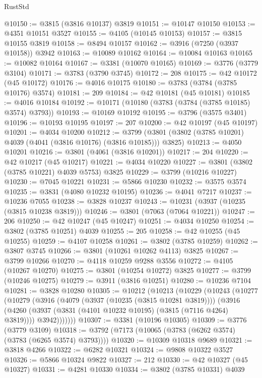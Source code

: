 \begin{lexlean}{RustStd}
\begin{coremodule}
@10150 := @3815 (@3816 @10137) @3819
@10151 := @10147 @10150
@10153 := @4351 @10151 @3527
@10155 := @4105 (@10145 @10153)
@10157 := @3815 @10155 @3819
@10158 := @8494 @10157
@10162 := @3916 (@7250 (@3937 @10158)) @3942
@10163 := @10089 @10162
@10164 := @10084 @10163
@10165 := @10082 @10164
@10167 := @3381 (@10070 @10165)
@10169 := @3776 (@3779 @3104)
@10171 := @3783 (@3790 @3745)
@10172 := 208
@10175 := @42 @10172 (@45 @10172)
@10176 := @4016 @10175
@10180 := @3783 (@3784 (@3785 @10176) @3574)
@10181 := 209
@10184 := @42 @10181 (@45 @10181)
@10185 := @4016 @10184
@10192 := @10171 (@10180 (@3783 (@3784 (@3785 @10185) @3574) @3793))
@10193 := @10169 @10192
@10195 := @3796 (@3575 @3401)
@10196 := @10193 @10195
@10197 := 207
@10200 := @42 @10197 (@45 @10197)
@10201 := @4034 @10200
@10212 := @3799 (@3801 (@3802 (@3785 @10201) @4039 (@4041 (@3816 @10176) (@3816 @10185))) @3825)
@10213 := @4050 @10201
@10216 := @3801 (@4061 (@3816 @10201))
@10217 := 204
@10220 := @42 @10217 (@45 @10217)
@10221 := @4034 @10220
@10227 := @3801 (@3802 (@3785 @10221) @4039 @5753) @3825
@10229 := @3799 (@10216 @10227)
@10230 := @7045 @10221
@10231 := @5866 @10230
@10232 := @3575 @3574
@10235 := @3831 (@4080 @10232 @10195)
@10236 := @4041 @7217
@10237 := @10236 @7055
@10238 := @3828 @10237
@10243 := @10231 (@3937 (@10235 (@3815 @10238 @3819)))
@10246 := @3801 (@7063 (@7064 @10221))
@10247 := 206
@10250 := @42 @10247 (@45 @10247)
@10251 := @4034 @10250
@10254 := @3802 (@3785 @10251) @4039
@10255 := 205
@10258 := @42 @10255 (@45 @10255)
@10259 := @4107 @10258
@10261 := @3802 (@3785 @10259)
@10262 := @3807 @3745
@10266 := @3801 (@10261 @10262 @4113) @3825
@10267 := @3799 @10266
@10270 := @4118 @10259 @9288 @3556
@10272 := @4105 (@10267 @10270)
@10275 := @3801 (@10254 @10272) @3825
@10277 := @3799 (@10246 @10275)
@10279 := @3911 (@3816 @10251)
@10280 := @10236 @7104
@10281 := @3828 @10280
@10305 := @10212
    (@10213
      (@10229
        (@10243
          (@10277
            (@10279
              (@3916
                (@4079 (@3937 (@10235 (@3815 @10281 @3819))))
                (@3916
                  (@4260 (@3937 (@3831 (@4101 @10232 @10195) (@3815 (@7116 @4264) @3819))))
                  @3942)))))))
@10307 := @3381 (@10196 @10305)
@10309 := @3776 (@3779 @3109)
@10318 := @3792 (@7173 (@10065 (@3783 (@6262 @3574) (@3783 (@6265 @3574) @3793))))
@10320 := @10309 @10318 @9689
@10321 := @3818 @4266
@10322 := @6282 @10321
@10324 := @9808 @10322 @3527
@10326 := @5866 @10324 @9822
@10327 := 212
@10330 := @42 @10327 (@45 @10327)
@10331 := @4281 @10330
@10334 := @3802 (@3785 @10331) @4039

\end{coremodule}
\end{lexlean}
